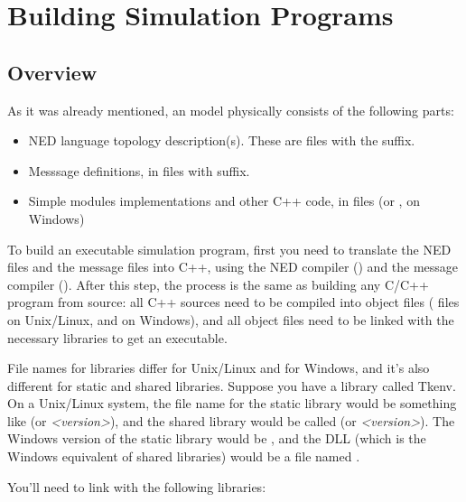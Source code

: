 \chapter{Building Simulation Programs}
\label{cha:building-simulation-programs}




\section{Overview}

As it was already mentioned, an {\opp} model physically consists of
the following parts:
\begin{itemize}
  \item{NED language topology description(s). These
      are files with the  suffix.}
  \item{Messsage definitions, in files
      with  suffix.}
  \item{Simple modules implementations and other C++ code, in 
        files (or , on Windows)}
\end{itemize}


To build an executable simulation program,
first you need to translate the NED files
and the message files into C++, using the NED compiler
() and the message compiler ().
After this step, the process is the same as building any C/C++
program from source: all C++ sources need to be compiled into object files
( files on Unix/Linux, and  on Windows),
and all object files need to be linked with the necessary libraries to get
an executable.


File names for libraries differ for Unix/Linux and for Windows,
and it's also different for static and shared libraries.
Suppose you have a library called Tkenv.
On a Unix/Linux system, the file name for the static library
would be something like  (or \textit{<version>}),
and the shared library would be called 
(or \textit{<version>}).
The Windows version of the static library would be ,
and the DLL (which is the Windows equivalent of shared libraries)
would be a file named .

You'll need to link with the following libraries:

